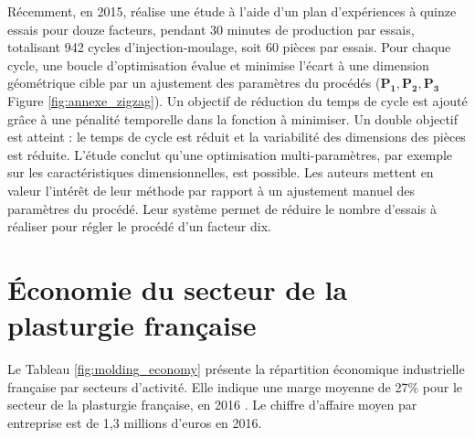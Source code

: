 Récemment, en 2015, \cite{johnston_-line_2015} réalise une étude à l'aide d'un plan d'expériences à quinze essais pour douze facteurs, pendant 30 minutes de production par essais, totalisant 942 cycles d'injection-moulage, soit 60 pièces par essais.
Pour chaque cycle, une boucle d'optimisation évalue et minimise l'écart à une dimension géométrique cible par un ajustement des paramètres du procédés ($\boldsymbol{P_1, P_2, P_3}$ Figure \ref{fig:annexe_zigzag}).
Un objectif de réduction du temps de cycle est ajouté grâce à une pénalité temporelle dans la fonction à minimiser.
Un double objectif est atteint : le temps de cycle est réduit et la variabilité des dimensions des pièces est réduite.
L'étude conclut qu’une optimisation  multi-paramètres, par exemple sur les caractéristiques dimensionnelles, est possible.
Les auteurs mettent en valeur l'intérêt de leur méthode par rapport à un ajustement manuel des paramètres du procédé.
Leur système permet de réduire le nombre d'essais à réaliser pour régler le procédé d'un facteur dix.




\FloatBarrier
\chapter{Économie du secteur de la plasturgie française}
\label{Ann:2}

Le Tableau \ref{fig:molding_economy} présente la répartition économique industrielle française par secteurs d'activité.
Elle indique une marge moyenne de 27\% pour le secteur de la plasturgie française, en 2016 \cite{directiongeneraledesentreprises_chiffres_2019}.
Le chiffre d'affaire moyen par entreprise est de 1,3 millions d'euros en 2016.

